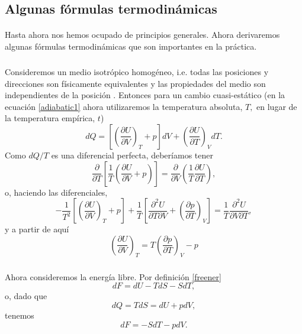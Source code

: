 \documentclass{article}
\theoremstyle{definition} \newtheorem{defi}{Definici\'on}
\theoremstyle{definition} \newtheorem{teo}{Teorema}
\theoremstyle{definition} \newtheorem{cor}{Corolario}
\begin{document}
\subsection{Algunas f\'ormulas termodin\'amicas}
\paragraph{}
Hasta ahora nos hemos ocupado de principios generales. Ahora derivaremos algunas f\'ormulas termodin\'amicas que son importantes en la pr\'actica.
\subparagraph{}
Consideremos un medio isotr\'opico homog\'eneo, i.e. todas las posiciones y direcciones son f\'isicamente equivalentes y las propiedades del medio son independientes de la posici\'on \cite{MB}. Entonces para un cambio cuasi-est\'atico (en la ecuaci\'on \eqref{adiabatic1} ahora utilizaremos la temperatura absoluta, $T,$ en lugar de la temperatura emp\'irica, $t$)
\begin{equation}
dQ = \left[\left(\frac{\partial{U}}{\partial{V}}\right)_T + p\right] dV + \left(\frac{\partial{U}}{\partial{T}}\right)_VdT.
\end{equation}
Como $dQ/T$ es una diferencial perfecta, deber\'iamos tener
\begin{equation}
\frac{\partial}{\partial T}\left[\frac{1}{T}\left(\frac{\partial U}{\partial V}+p\right)\right] =\frac{\partial}{\partial V}\left(\frac{1}{T}\frac{\partial U}{\partial T}\right),
\end{equation}
o, haciendo las diferenciales,
\begin{equation}
-\frac{1}{T^2}\left[\left(\frac{\partial{U}}{\partial{V}}\right)_T + p\right]+\frac{1}{T}\left[ \frac{\partial^2U}{\partial T\partial V}+ \left(\frac{\partial p}{\partial T}\right)_V\right]=\frac{1}{T}\frac{\partial^2U}{\partial V\partial T},
\end{equation}
y a partir de aqu\'i
\begin{equation}
\left(\frac{\partial{U}}{\partial{V}}\right)_T=T\left(\frac{\partial p}{\partial T}\right)_V-p
\end{equation}
\subparagraph{}
Ahora consideremos la energ\'ia libre. Por definici\'on \eqref{freener}
\begin{equation}
dF=dU-TdS-SdT,
\end{equation}
o, dado que
\begin{equation}
dQ=TdS=dU+pdV,
\end{equation}
tenemos
\begin{equation}\label{diffree}
dF=-SdT-pdV.
\end{equation}
\end{document}
